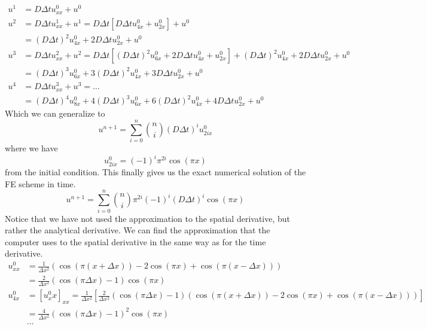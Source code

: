 \begin{align*}
 u^1 &= D\Delta t u_{xx}^0 + u^0 \\
 u^2 &= D\Delta t u_{xx}^1 + u^1 = D\Delta t\left[D\Delta t u_{4x}^0 + u_{2x}^0\right] + u^0\\
 &= \left(D\Delta t\right)^2 u_{4x}^0 + 2D\Delta t u_{2x}^0+ u^0 \\
 u^3 &= D\Delta t u_{xx}^2 + u^2 = D\Delta t\left[\left(D\Delta t\right)^2 u_{6x}^0 + 2D\Delta t u_{4x}^0+ u_{2x}^0\right] + \left(D\Delta t\right)^2 u_{4x}^0 + 2D\Delta t u_{2x}^0+ u^0\\
 &= \left(D\Delta t\right)^3 u_{6x}^0 + 3\left(D\Delta t\right)^2 u_{4x}^0+ 3D\Delta tu_{2x}^0 + u^0 \\
 u^4 &= D\Delta t u_{xx}^3 + u^3 = \dots \\
 &= \left(D\Delta t\right)^4 u_{8x}^0 + 4\left(D\Delta t\right)^3 u_{6x}^0+ 6\left(D\Delta t\right)^2 u_{4x}^0 + 4D\Delta t u_{2x}^0 + u^0 
\end{align*}
Which we can generalize to 
\begin{equation}
 u^{n+1} = \sum\limits_{i=0}^n {n\choose i}\left(D\Delta t\right)^iu^0_{2ix}
\end{equation}
where we have
\begin{equation*}
 u^0_{2ix} = \left(-1\right)^i\pi^{2i}\cos(\pi x)
\end{equation*}
from the initial condition. This finally gives us the exact numerical solution of the FE scheme in time. 
\begin{equation}
 u^{n+1} = \sum\limits_{i=0}^n {n\choose i}\pi^{2i}\left(-1\right)^i\left(D\Delta t\right)^i\cos(\pi x)
\end{equation}
Notice that we have not used the approximation to the spatial derivative, but rather the analytical derivative. 
We can find the approximation that the computer uses to the spatial derivative in the same way as for the time derivative. 
\begin{align*}
 u^0_{xx} &= \frac{1}{\Delta x^2}\left(\cos(\pi(x+\Delta x)) -2\cos(\pi x) +\cos(\pi(x-\Delta x))\right) \\
 &= \frac{2}{\Delta x^2}\left(\cos(\pi\Delta x)-1\right)\cos(\pi x)\\
 u^0_{4x} &= [u^0_xx]_{xx} = \frac{1}{\Delta x^2}\left[\frac{2}{\Delta x^2}\left(\cos(\pi\Delta x)-1\right)\left(\cos(\pi(x+\Delta x)) -2\cos(\pi x) +\cos(\pi(x-\Delta x))\right)\right]\\
 &= \frac{4}{\Delta x^2}\left(\cos(\pi\Delta x)-1\right)^2\cos(\pi x)\\
 &\dots
\end{align*}
